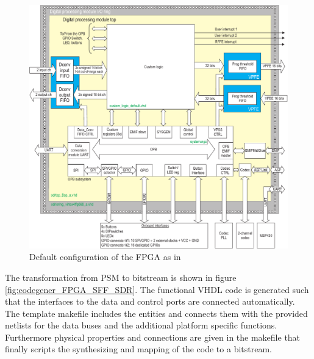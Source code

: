 \begin{figure}[htbp]
	\centering
		\includegraphics[width=1.00\textwidth]{../kapitel03/figures/sff_fpga.pdf}
	\caption{Default configuration of the FPGA as in \cite{lyrtech_sff_sdr}}
	\label{fig:sff_fpga}
\end{figure}

The transformation from \ac{PSM} to bitstream is shown in figure \ref{fig:codegener_FPGA_SFF_SDR}. The functional VHDL code is generated such that the interfaces to the data and control ports are connected automatically. The template makefile includes the entities and connects them with the provided netlists for the data buses and the additional platform specific functions. Furthermore physical properties and connections are given in the makefile that finally scripts the synthesizing and mapping of the code to a bitstream.


